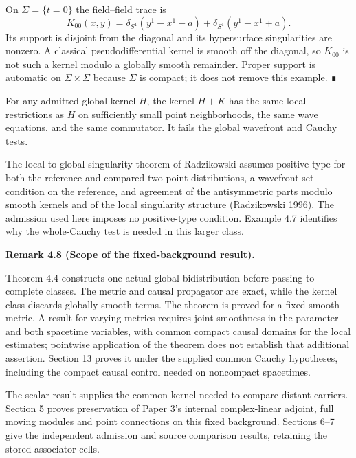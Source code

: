 \documentclass[
  english,
  11pt,
  reqno]{amsart}
\makeatletter
\newcommand{\pandocstatementheading}[1]{%
  \par\addpenalty{\@beginparpenalty}%
  \addvspace{.5\baselineskip plus .2\baselineskip minus .2\baselineskip}%
  {\normalfont\bfseries #1\par}%
  \nobreak\@afterindenttrue\@afterheading
}
\makeatother
\begin{document}
On \(\Sigma=\{t=0\}\) the field--field trace is \[
K_{00}(x,y)
=\delta_{S^1}(y^1-x^1-a)
+\delta_{S^1}(y^1-x^1+a).
\] Its support is disjoint from the diagonal and its hypersurface
singularities are nonzero. A classical pseudodifferential kernel is
smooth off the diagonal, so \(K_{00}\) is not such a kernel modulo a
globally smooth remainder. Proper support is automatic on
\(\Sigma\times\Sigma\) because \(\Sigma\) is compact; it does not remove
this example. ∎

For any admitted global kernel \(H\), the kernel \(H+K\) has the same
local restrictions as \(H\) on sufficiently small point neighborhoods,
the same wave equations, and the same commutator. It fails the global
wavefront and Cauchy tests.

The local-to-global singularity theorem of Radzikowski assumes positive
type for both the reference and compared two-point distributions, a
wavefront-set condition on the reference, and agreement of the
antisymmetric parts modulo smooth kernels and of the local singularity
structure (\hyperref[ref-RadzikowskiVerch1996]{Radzikowski 1996}). The
admission used here imposes no positive-type condition. Example 4.7
identifies why the whole-Cauchy test is needed in this larger class.

\pandocstatementheading{\protect{}\label{rem:p4-wave-proof-scope}Remark 4.8 (Scope of the fixed-background result).}

Theorem 4.4 constructs one actual global bidistribution before passing
to complete classes. The metric and causal propagator are exact, while
the kernel class discards globally smooth terms. The theorem is proved
for a fixed smooth metric. A result for varying metrics requires joint
smoothness in the parameter and both spacetime variables, with common
compact causal domains for the local estimates; pointwise application of
the theorem does not establish that additional assertion. Section 13
proves it under the supplied common Cauchy hypotheses, including the
compact causal control needed on noncompact spacetimes.

The scalar result supplies the common kernel needed to compare distant
carriers. Section 5 proves preservation of Paper 3's internal
complex-linear adjoint, full moving modules and point connections on
this fixed background. Sections 6--7 give the independent admission and
source comparison results, retaining the stored associator cells.

\protect{}\label{sec:global-carrier-completion}
\end{document}

